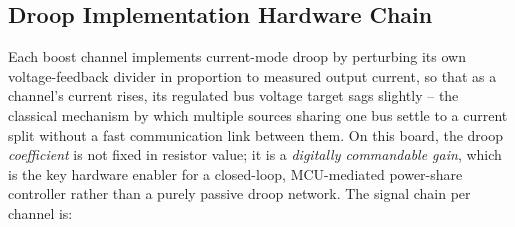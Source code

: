 \subsection{Droop Implementation Hardware Chain}
\label{sec:droop-hardware}


Each boost channel implements current-mode droop by perturbing its own
voltage-feedback divider in proportion to measured output current, so
that as a channel's current rises, its regulated bus voltage target sags
slightly -- the classical mechanism by which multiple sources sharing one
bus settle to a current split without a fast communication link between
them. On this board, the droop \emph{coefficient} is not fixed in
resistor value; it is a \emph{digitally commandable gain}, which is the
key hardware enabler for a closed-loop, MCU-mediated power-share
controller rather than a purely passive droop network. The signal chain
per channel is:

